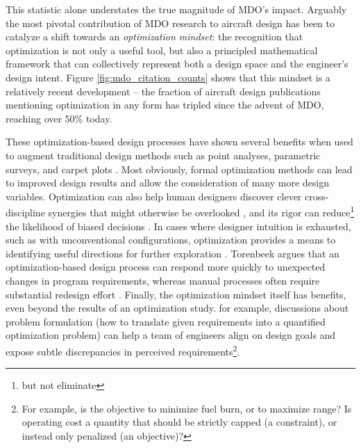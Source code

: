 This statistic alone understates the true magnitude of MDO's impact. Arguably the most pivotal contribution of MDO research to aircraft design has been to catalyze a shift towards an \textit{optimization mindset}: the recognition that optimization is not only a useful tool, but also a principled mathematical framework that can collectively represent both a design space and the engineer's design intent. Figure \ref{fig:mdo_citation_counts} shows that this mindset is a relatively recent development -- the fraction of aircraft design publications mentioning optimization in any form has tripled since the advent of MDO, reaching over 50\% today.

These optimization-based design processes have shown several benefits when used to augment traditional design methods such as point analyses, parametric surveys, and carpet plots \cite{torenbeek_advanced_2013, walton_cd_2020}. Most obviously, formal optimization methods can lead to improved design results and allow the consideration of many more design variables. Optimization can also help human designers discover clever cross-discipline synergies that might otherwise be overlooked \cite{drela_pros_1998}, and its rigor can reduce\footnote{but not eliminate} the likelihood of biased decisions \cite{torenbeek_advanced_2013}. In cases where designer intuition is exhausted, such as with unconventional configurations, optimization provides a means to identifying useful directions for further exploration \cite{drela_pros_1998}. Torenbeek argues that an optimization-based design process can respond more quickly to unexpected changes in program requirements, whereas manual processes often require substantial redesign effort \cite{torenbeek_advanced_2013}. Finally, the optimization mindset itself has benefits, even beyond the results of an optimization study. for example, discussions about problem formulation (how to translate given requirements into a quantified optimization problem) can help a team of engineers align on design goals and expose subtle discrepancies in perceived requirements\footnote{For example, is the objective to minimize fuel burn, or to maximize range? Is operating cost a quantity that should be strictly capped (a constraint), or instead only penalized (an objective)?}.

